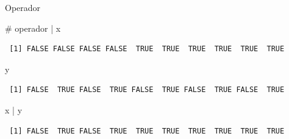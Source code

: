 \documentclass[
  ignorenonframetext,
  aspectratio=169,
  spanish,
]{beamer}
\newenvironment{Shaded}{\begin{snugshade}}{\end{snugshade}}
\newcommand{\CommentTok}[1]{\textcolor[rgb]{0.37,0.37,0.37}{#1}}
\newcommand{\NormalTok}[1]{\textcolor[rgb]{0.00,0.23,0.31}{#1}}
\newcommand{\SpecialCharTok}[1]{\textcolor[rgb]{0.37,0.37,0.37}{#1}}
\begin{document}
\begin{frame}[fragile]{Operador \texttt{\textbar{}}}
\label{operador-1}
\begin{Shaded}
\begin{Highlighting}[]
\CommentTok{\# operador | }
\NormalTok{x}
\end{Highlighting}
\end{Shaded}

\begin{verbatim}
 [1] FALSE FALSE FALSE FALSE  TRUE  TRUE  TRUE  TRUE  TRUE  TRUE
\end{verbatim}

\begin{Shaded}
\begin{Highlighting}[]
\NormalTok{y }
\end{Highlighting}
\end{Shaded}

\begin{verbatim}
 [1] FALSE  TRUE FALSE  TRUE FALSE  TRUE FALSE  TRUE FALSE  TRUE
\end{verbatim}

\begin{Shaded}
\begin{Highlighting}[]
\NormalTok{x }\SpecialCharTok{|}\NormalTok{ y}
\end{Highlighting}
\end{Shaded}

\begin{verbatim}
 [1] FALSE  TRUE FALSE  TRUE  TRUE  TRUE  TRUE  TRUE  TRUE  TRUE
\end{verbatim}
\end{frame}
\end{document}
